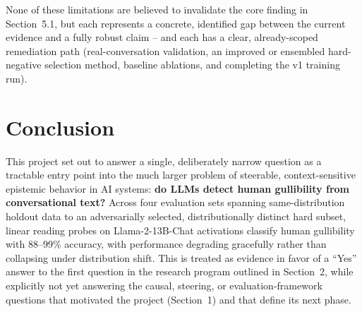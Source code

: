 \documentclass[11pt]{article}
\begin{document}
None of these limitations are believed to invalidate the core finding in Section~5.1, but each represents a concrete, identified gap between the current evidence and a fully robust claim -- and each has a clear, already-scoped remediation path (real-conversation validation, an improved or ensembled hard-negative selection method, baseline ablations, and completing the v1 training run).

\section{Conclusion}

This project set out to answer a single, deliberately narrow question as a tractable entry point into the much larger problem of steerable, context-sensitive epistemic behavior in AI systems: \textbf{do LLMs detect human gullibility from conversational text?} Across four evaluation sets spanning same-distribution holdout data to an adversarially selected, distributionally distinct hard subset, linear reading probes on Llama-2-13B-Chat activations classify human gullibility with 88--99\% accuracy, with performance degrading gracefully rather than collapsing under distribution shift. This is treated as evidence in favor of a ``Yes'' answer to the first question in the research program outlined in Section~2, while explicitly not yet answering the causal, steering, or evaluation-framework questions that motivated the project (Section~1) and that define its next phase.
\end{document}
